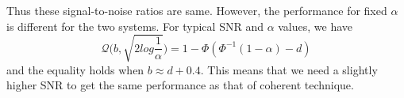 \documentclass[a4paper,english,12pt]{article}
\begin{document}
\par Thus these signal-to-noise ratios are same. However, the performance for fixed $\alpha$ is different for the two systems. For typical SNR and $\alpha$ values, we have
\begin{equation}
 \label{n21}
\mathcal{Q}\bigg(b,\sqrt{2log\frac{1}{\alpha}}\bigg)  =1-\Phi(\Phi^{-1}(1-\alpha)-d)
\end{equation} 
and the equality holds when $b\approx d+0.4$. This means that we need a slightly higher SNR to get the same performance as that of coherent technique.
\end{document}
